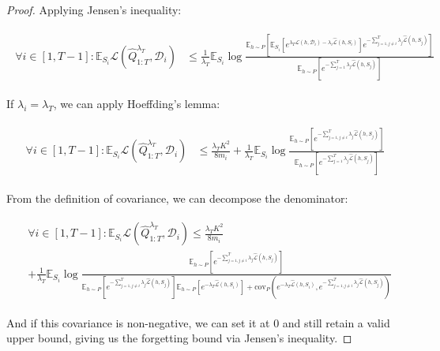 \documentclass{article}
\theoremstyle{plain}
\theoremstyle{definition}
\theoremstyle{remark}
\begin{document}
\begin{proof}
Applying Jensen's inequality:

\begin{align*} 
\begin{split}
\forall i\in[1,T-1]:
\mathbb{E}_{S_i}\mathcal{L}(\hat{Q}^{\lambda_T}_{1:T}, \mathcal{D}_i) &\leq \frac{1}{\lambda_T}\mathbb{E}_{S_i}\log\frac{\mathbb{E}_{h\sim P}\left [\mathbb{E}_{S_i}\left [e^{\lambda_T\mathcal{L}(h,\mathcal{D}_i)-\lambda_i\hat{\mathcal{L}}(h,S_i)} \right ]e^{-\sum_{j=1,j\neq i}^{T}\lambda_j\hat{\mathcal{L}}(h,S_j)} \right ]}{\mathbb{E}_{h\sim P}\left [e^{-\sum_{j=1}^{T}\lambda_j\hat{\mathcal{L}}(h,S_j)} \right ]}
\end{split}
\end{align*}

If $\lambda_i=\lambda_T$, we can apply Hoeffding's lemma:

\begin{align*} 
\begin{split}
\forall i\in[1,T-1]:
\mathbb{E}_{S_i}\mathcal{L}(\hat{Q}^{\lambda_T}_{1:T}, \mathcal{D}_i) &\leq \frac{\lambda_T K^2}{8m_i}+\frac{1}{\lambda_T}\mathbb{E}_{S_i}\log\frac{\mathbb{E}_{h\sim P}\left [e^{-\sum_{j=1,j\neq i}^{T}\lambda_j\hat{\mathcal{L}}(h,S_j)} \right ]}{\mathbb{E}_{h\sim P}\left [e^{-\sum_{j=1}^{T}\lambda_j\hat{\mathcal{L}}(h,S_j)} \right ]}
\end{split}
\end{align*}

From the definition of covariance, we can decompose the denominator:

\begin{align} \label{eq-oracle-forget-extend}
\begin{split}
&\forall i\in[1,T-1]:
\mathbb{E}_{S_i}\mathcal{L}(\hat{Q}^{\lambda_T}_{1:T}, \mathcal{D}_i) \leq \frac{\lambda_T K^2}{8m_i}\\&+\frac{1}{\lambda_T}\mathbb{E}_{S_i}\log\frac{\mathbb{E}_{h\sim P}\left [e^{-\sum_{j=1,j\neq i}^{T}\lambda_j\hat{\mathcal{L}}(h,S_j)} \right ]}{\mathbb{E}_{h\sim P}\left [e^{-\sum_{j=1,j\neq i}^{T}\lambda_j\hat{\mathcal{L}}(h,S_j)} \right ]\mathbb{E}_{h\sim P}\left [e^{-\lambda_T\hat{\mathcal{L}}(h,S_i)} \right ]+\mathrm{cov}_{P}(e^{-\lambda_T\hat{\mathcal{L}}(h,S_i)}, e^{-\sum_{j=1,j\neq i}^{T}\lambda_j\hat{\mathcal{L}}(h,S_j)})}
\end{split}
\end{align}

And if this covariance is non-negative, we can set it at $0$ and still retain a valid upper bound, giving us the forgetting bound via Jensen's inequality.


\end{proof}
\end{document}
